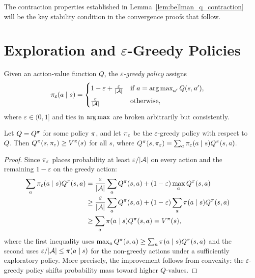 \documentclass[11pt,a4paper]{article}
\begin{document}
The contraction properties established in
Lemma~\ref{lem:bellman_q_contraction} will be the key stability
condition in the convergence proofs that follow.

\section{Exploration and $\varepsilon$-Greedy Policies}
\label{sec:exploration}

\begin{definition}
\label{def:epsilon_greedy}
Given an action-value function $Q$, the \emph{$\varepsilon$-greedy
policy} assigns
\begin{equation}
  \pi_\varepsilon(a \mid s) = \begin{cases}
    1 - \varepsilon + \frac{\varepsilon}{|\mathcal{A}|}
      & \text{if } a = \operatorname{arg\,max}_{a'} Q(s,a'), \\[4pt]
    \frac{\varepsilon}{|\mathcal{A}|}
      & \text{otherwise,}
  \end{cases}
  \label{eq:eps_greedy}
\end{equation}
where $\varepsilon \in (0,1]$ and ties in $\operatorname{arg\,max}$ are broken
arbitrarily but consistently.
\end{definition}

\begin{proposition}
\label{prop:eps_improvement}
Let $Q = Q^{\pi}$ for some policy $\pi$, and let
$\pi_\varepsilon$ be the $\varepsilon$-greedy policy with
respect to $Q$. Then
$Q^{\pi}(s, \pi_\varepsilon) \geq V^{\pi}(s)$ for all $s$,
where $Q^{\pi}(s, \pi_\varepsilon)
= \sum_a \pi_\varepsilon(a \mid s) Q^{\pi}(s,a)$.
\end{proposition}

\begin{proof}
Since $\pi_\varepsilon$ places probability at least
$\varepsilon/|\mathcal{A}|$ on every action and the remaining
$1 - \varepsilon$ on the greedy action:
\begin{align}
  \sum_a \pi_\varepsilon(a \mid s) Q^{\pi}(s,a)
  &= \frac{\varepsilon}{|\mathcal{A}|} \sum_a Q^{\pi}(s,a)
     + (1 - \varepsilon) \max_a Q^{\pi}(s,a) \nonumber\\
  &\geq \frac{\varepsilon}{|\mathcal{A}|} \sum_a Q^{\pi}(s,a)
     + (1 - \varepsilon) \sum_a \pi(a \mid s) Q^{\pi}(s,a)
     \nonumber\\
  &\geq \sum_a \pi(a \mid s) Q^{\pi}(s,a) = V^{\pi}(s),
  \label{eq:eps_improvement}
\end{align}
where the first inequality uses
$\max_a Q^{\pi}(s,a) \geq \sum_a \pi(a \mid s) Q^{\pi}(s,a)$
and the second uses $\varepsilon/|\mathcal{A}| \leq \pi(a \mid s)$
for the non-greedy actions under a sufficiently exploratory policy.
More precisely, the improvement follows from convexity: the
$\varepsilon$-greedy policy shifts probability mass toward higher
$Q$-values.
\end{proof}
\end{document}

